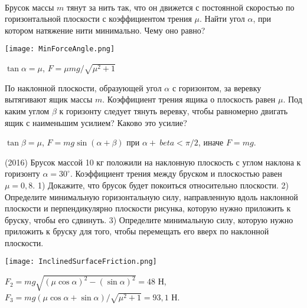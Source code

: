 \begin{ex}
\hspace{0pt} \\
\begin{minipage}{.65\textwidth}
Брусок массы $m$ тянут за нить так, что он движется с постоянной скоростью по
горизонтальной плоскости с коэффициентом трения $\mu$. Найти угол $\alpha$, при котором натяжение нити минимально. Чему оно равно?
\end{minipage}
\begin{minipage}{.35\textwidth}
\centering
\texttt{[image: MinForceAngle.png]}
\end{minipage}
\begin{ans}
$\tan \alpha = \mu$, $F = \mu mg / \sqrt{\mu^2 + 1}$
\end{ans}
\end{ex}

\begin{ex}
По наклонной плоскости, образующей угол $\alpha$ с горизонтом, за веревку вытягивают ящик массы $m$. 
Коэффициент трения ящика о плоскость равен $\mu$. Под каким углом $\beta$ к горизонту следует тянуть веревку, 
чтобы равномерно двигать ящик с наименьшим усилием? Каково это усилие?
\begin{ans}
$\tan \beta = \mu$, $F = mg \sin (\alpha + \beta)$ при $\alpha + \ beta < \pi/2$, иначе $F = mg$.
\end{ans}
\end{ex}

\begin{ex}
(2016) Брусок массой 10 кг положили на наклонную плоскость с углом наклона к горизонту $\alpha = 30^{\circ}$. Коэффициент трения между бруском и плоскостью равен $\mu = 0,8$. 1) Докажите, что брусок будет покоиться относительно плоскости. 2) Определите минимальную горизонтальную силу, направленную вдоль наклонной плоскости и перпендикулярно плоскости рисунка, которую нужно приложить к бруску, чтобы его сдвинуть. 3) Определите минимальную силу‚ которую нужно приложить к бруску для того, чтобы перемещать его вверх по наклонной плоскости.
\begin{center}
\texttt{[image: InclinedSurfaceFriction.png]}
\end{center}
\begin{ans}
$F_2 = mg \sqrt{(\mu \cos \alpha)^2 - (\sin \alpha)^2} = 48$ Н, $F_3 = mg(\mu \cos \alpha + \sin \alpha)/\sqrt{\mu^2 + 1} = 93,1$ Н. 
\end{ans}
\end{ex}

